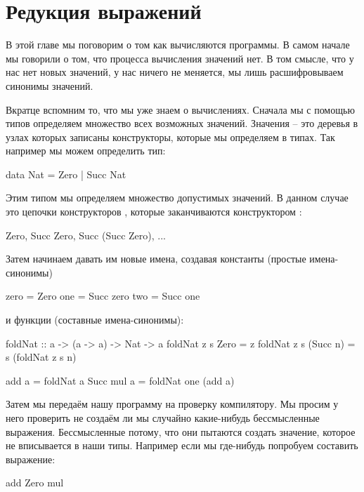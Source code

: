 \setcounter{chapter}{8}
\chapter{Редукция выражений}

В этой главе мы поговорим о том как вычисляются программы. 
В самом начале мы говорили о том, что 
процесса вычисления значений нет. В том смысле, что у нас
нет новых значений, у нас ничего не меняется, мы лишь
расшифровываем синонимы значений.

Вкратце вспомним то, что мы уже знаем о вычислениях.
Сначала мы с помощью типов определяем
множество всех возможных значений. Значения -- это деревья
в узлах которых записаны конструкторы, которые мы 
определяем в типах. Так например мы можем определить тип:

\begin{code}
data Nat = Zero | Succ Nat
\end{code}

Этим типом мы определяем множество допустимых значений. 
В данном случае это цепочки конструкторов ,
которые заканчиваются конструктором :

\begin{code}
Zero, Succ Zero, Succ (Succ Zero), ...
\end{code}
    
Затем начинаем давать им
новые имена, создавая константы (простые имена-синонимы) 
  
\begin{code}
zero    = Zero
one     = Succ zero
two     = Succ one
\end{code}


\noindent и функции (составные имена-синонимы):

\begin{code}
foldNat :: a -> (a -> a) -> Nat -> a
foldNat z  s  Zero      = z
foldNat z  s  (Succ n)  = s (foldNat z s n)

add a = foldNat a   Succ
mul a = foldNat one (add a) 
\end{code}

Затем мы передаём нашу программу на проверку компилятору. 
Мы просим у него проверить не создаём ли мы случайно 
какие-нибудь бессмысленные
выражения. Бессмысленные потому, что они пытаются 
создать значение, которое не вписывается в наши типы.
Например если мы где-нибудь попробуем составить выражение:

\begin{code}
add Zero mul
\end{code}

